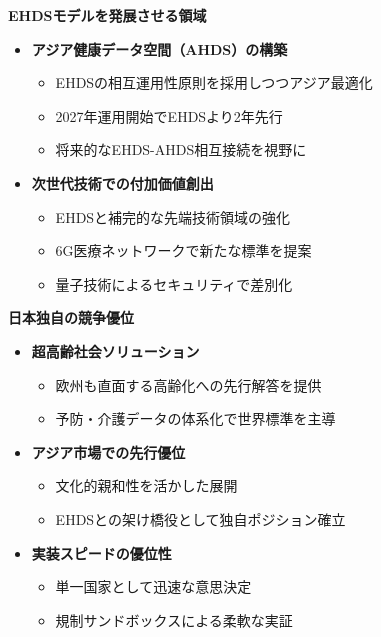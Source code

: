 \documentclass[
  a4paper,
  a4paper,
  11pt]{ltjsbook}
\providecommand{\tightlist}{%
  \setlength{\itemsep}{0pt}\setlength{\parskip}{0pt}}
\begin{document}
\textbf{EHDSモデルを発展させる領域}

\begin{itemize}
\tightlist
\item
  \textbf{アジア健康データ空間（AHDS）の構築}

  \begin{itemize}
  \tightlist
  \item
    EHDSの相互運用性原則を採用しつつアジア最適化
  \item
    2027年運用開始でEHDSより2年先行
  \item
    将来的なEHDS-AHDS相互接続を視野に
  \end{itemize}
\item
  \textbf{次世代技術での付加価値創出}

  \begin{itemize}
  \tightlist
  \item
    EHDSと補完的な先端技術領域の強化
  \item
    6G医療ネットワークで新たな標準を提案\\
  \item
    量子技術によるセキュリティで差別化
  \end{itemize}
\end{itemize}

\textbf{日本独自の競争優位}

\begin{itemize}
\tightlist
\item
  \textbf{超高齢社会ソリューション}

  \begin{itemize}
  \tightlist
  \item
    欧州も直面する高齢化への先行解答を提供
  \item
    予防・介護データの体系化で世界標準を主導
  \end{itemize}
\item
  \textbf{アジア市場での先行優位}

  \begin{itemize}
  \tightlist
  \item
    文化的親和性を活かした展開
  \item
    EHDSとの架け橋役として独自ポジション確立
  \end{itemize}
\item
  \textbf{実装スピードの優位性}

  \begin{itemize}
  \tightlist
  \item
    単一国家として迅速な意思決定
  \item
    規制サンドボックスによる柔軟な実証
  \end{itemize}
\end{itemize}
\end{document}
